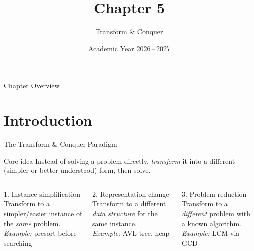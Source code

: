 \documentclass[aspectratio=169]{beamer}
\title[Ch.\,5 -- Transform \& Conquer]{Chapter 5}
\subtitle{Transform \& Conquer}
\date{Academic Year 2026\,--\,2027}
\begin{document}
\begin{frame}[plain]\titlepage\end{frame}
\begin{frame}{Chapter Overview}
  \begin{center}
    \begin{minipage}{0.85\textwidth}
      \tableofcontents[hideallsubsections,sectionstyle=show/shaded]
    \end{minipage}
  \end{center}
\end{frame}

\section{Introduction}

\begin{frame}[shrink=12]{The Transform \& Conquer Paradigm}
  \begin{block}{Core idea}
    Instead of solving a problem directly, \emph{transform} it into a
    different (simpler or better-understood) form, then solve.
  \end{block}
  \vspace{0.4em}
  \vspace{0.5em}
  \begin{columns}[T]
      \begin{block}{1. Instance simplification}
        Transform to a simpler/easier instance of the \emph{same} problem.\\[0.3em]
        \emph{Example:} presort before searching
      \end{block}
      \begin{block}{2. Representation change}
        Transform to a different \emph{data structure} for the same instance.\\[0.3em]
        \emph{Example:} AVL tree, heap
      \end{block}
      \begin{block}{3. Problem reduction}
        Transform to a \emph{different} problem with a known algorithm.\\[0.3em]
        \emph{Example:} LCM via GCD
      \end{block}
  \end{columns}
\end{frame}
\end{document}
